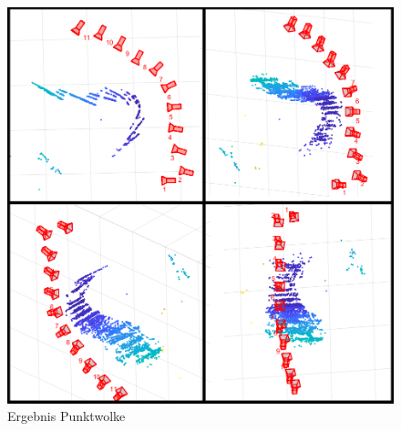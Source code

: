 \begin{figure}[ht]
    \centering
    \includegraphics[scale=0.4]{Figures/ErgebnisZusammen.png}
    \caption{Ergebnis Punktwolke}
\end{figure}

\clearpage

